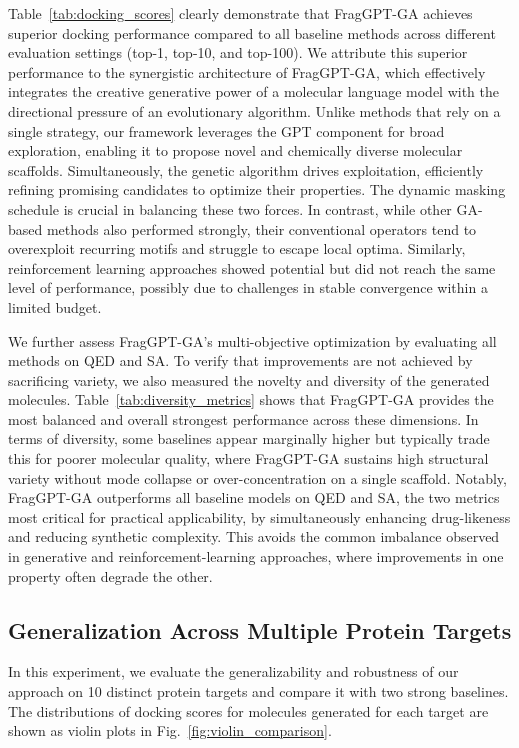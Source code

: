 \documentclass[lettersize,journal]{IEEEtran}
\begin{document}
Table~\ref{tab:docking_scores} clearly demonstrate that FragGPT-GA achieves superior docking performance compared to all baseline methods across different evaluation settings (top-1, top-10, and top-100). We attribute this superior performance to the synergistic architecture of FragGPT-GA, which effectively integrates the creative generative power of a molecular language model with the directional pressure of an evolutionary algorithm. Unlike methods that rely on a single strategy, our framework leverages the GPT component for broad exploration, enabling it to propose novel and chemically diverse molecular scaffolds. Simultaneously, the genetic algorithm drives exploitation, efficiently refining promising candidates to optimize their properties. The dynamic masking schedule is crucial in balancing these two forces. In contrast, while other GA-based methods also performed strongly, their conventional operators tend to overexploit recurring motifs and struggle to escape local optima. Similarly, reinforcement learning approaches showed potential but did not reach the same level of performance, possibly due to challenges in stable convergence within a limited budget. 

We further assess FragGPT-GA’s multi-objective optimization by evaluating all methods on QED and SA. To verify that improvements are not achieved by sacrificing variety, we also measured the novelty and diversity of the generated molecules. Table~\ref{tab:diversity_metrics} shows that FragGPT-GA provides the most balanced and overall strongest performance across these dimensions. In terms of diversity, some baselines appear marginally higher but typically trade this for poorer molecular quality, where FragGPT-GA sustains high structural variety without mode collapse or over-concentration on a single scaffold. Notably, FragGPT-GA outperforms all baseline models on QED and SA, the two metrics most critical for practical applicability, by simultaneously enhancing drug-likeness and reducing synthetic complexity. This avoids the common imbalance observed in generative and reinforcement-learning approaches, where improvements in one property often degrade the other. 


\subsection{Generalization Across Multiple Protein Targets}

In this experiment, we evaluate the generalizability and robustness of our approach on 10 distinct protein targets and compare it with two strong baselines. The distributions of docking scores for molecules generated for each target are shown as violin plots in Fig.~\ref{fig:violin_comparison}.
\end{document}
